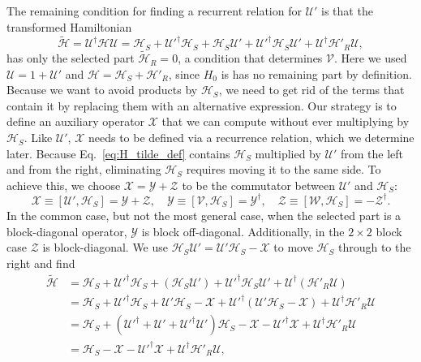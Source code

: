 The remaining condition for finding a recurrent relation for $\mathcal{U}'$ is that the transformed Hamiltonian
%
\begin{equation}
\label{eq:H_tilde_def}
\tilde{\mathcal{H}} = \mathcal{U}^\dagger \mathcal{H} \mathcal{U} = \mathcal{H}_{S} +
\mathcal{U}'^\dagger \mathcal{H}_{S} + \mathcal{H}_{S} \mathcal{U}' + \mathcal{U}'^\dagger \mathcal{H}_{S}
\mathcal{U}' + \mathcal{U}^\dagger\mathcal{H}'_{R}\mathcal{U},
\end{equation}
%
has only the selected part $\tilde{\mathcal{H}}_{R}=0$, a condition that determines $\mathcal{V}$.
Here we used $\mathcal{U}=1+\mathcal{U}'$ and $\mathcal{H} = \mathcal{H}_{S} + \mathcal{H}'_{R}$, since $H_0$ is has no remaining part by definition.
Because we want to avoid products by $\mathcal{H}_{S}$, we need to get rid of the terms that contain it by replacing them with an alternative expression.
Our strategy is to define an auxiliary operator $\mathcal{X}$ that we can compute without ever multiplying by $\mathcal{H}_{S}$.
Like $\mathcal{U}'$, $\mathcal{X}$ needs to be defined via a recurrence relation, which we determine later.
Because Eq.~\eqref{eq:H_tilde_def} contains $\mathcal{H}_{S}$ multiplied by $\mathcal{U}'$ from the left and from the right, eliminating $\mathcal{H}_{S}$ requires moving it to the same side.
To achieve this, we choose $\mathcal{X}=\mathcal{Y}+\mathcal{Z}$ to be the commutator between $\mathcal{U}'$ and $\mathcal{H}_{S}$:
%
\begin{equation}
\label{eq:XYZ}
\mathcal{X} \equiv [\mathcal{U}', \mathcal{H}_{S}] = \mathcal{Y} + \mathcal{Z}, \quad
\mathcal{Y} \equiv [\mathcal{V}, \mathcal{H}_{S}] = \mathcal{Y}^\dagger,\quad
\mathcal{Z} \equiv [\mathcal{W}, \mathcal{H}_{S}] = -\mathcal{Z}^\dagger.
\end{equation}
%
In the common case, but not the most general case, when the selected part is a block-diagonal operator, $\mathcal{Y}$ is block off-diagonal.
Additionally, in the $2\times 2$ block case $\mathcal{Z}$ is block-diagonal.
We use $\mathcal{H}_{S} \mathcal{U}' = \mathcal{U}' \mathcal{H}_{S} -\mathcal{X}$ to move $\mathcal{H}_{S}$ through to the right and find
%
\begin{equation}
\label{eq:H_tilde}
\begin{aligned}
  \tilde{\mathcal{H}}
  &= \mathcal{H}_{S} + \mathcal{U}'^\dagger \mathcal{H}_{S} + (\mathcal{H}_{S} \mathcal{U}') + \mathcal{U}'^\dagger \mathcal{H}_{S}
  \mathcal{U}' + \mathcal{U}^\dagger(\mathcal{H}'_{R}\mathcal{U})
  \\
  &= \mathcal{H}_{S} + \mathcal{U}'^\dagger \mathcal{H}_{S} + \mathcal{U}'\mathcal{H}_{S} - \mathcal{X} + \mathcal{U}'^\dagger (\mathcal{U}' \mathcal{H}_{S} - \mathcal{X}) + \mathcal{U}^\dagger\mathcal{H}'_{R}\mathcal{U} \\
  &= \mathcal{H}_{S} + (\mathcal{U}'^\dagger + \mathcal{U}' + \mathcal{U}'^\dagger \mathcal{U}')\mathcal{H}_{S} - \mathcal{X} - \mathcal{U}'^\dagger \mathcal{X} + \mathcal{U}^\dagger\mathcal{H}'_{R}\mathcal{U} \\
  &= \mathcal{H}_{S} - \mathcal{X} - \mathcal{U}'^\dagger \mathcal{X} + \mathcal{U}^\dagger\mathcal{H}'_{R}\mathcal{U},
\end{aligned}
\end{equation}
